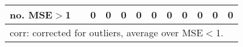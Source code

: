 {{\begin{sidewaystable}
\begin{tabular}{cc cc | cccc | cccc}
no. MSE$>$1 && 0 & 0 & 0 & 0 & 0 & 0 &0 & 0 & 0 & 0 \\[1ex] 
\hline 
\multicolumn{12}{l}{\footnotesize{corr: corrected for outliers, average over MSE$<$1.}}  \\ 
\end{tabular}
\label{tab:arch1_pcp_var}  
\end{sidewaystable}
}
}